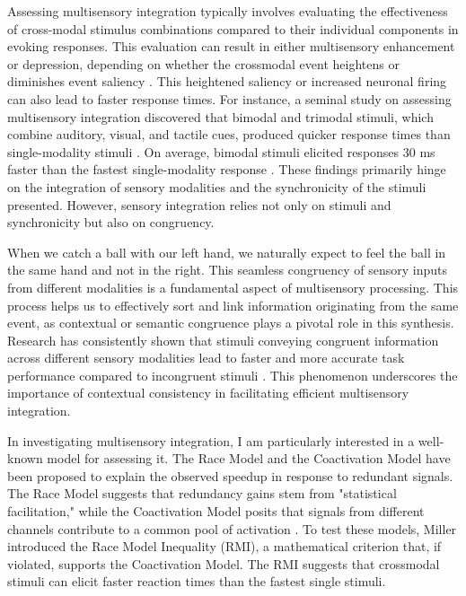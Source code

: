 \documentclass[12pt,oneside,openright]{report}
\begin{document}
Assessing multisensory integration typically involves evaluating the effectiveness of cross-modal stimulus combinations compared to their individual components in evoking responses. This evaluation can result in either multisensory enhancement or depression, depending on whether the crossmodal event heightens or diminishes event saliency \parencite{Stein2008MultisensoryIC}. This heightened saliency or increased neuronal firing can also lead to faster response times. For instance, a seminal study on assessing multisensory integration discovered that bimodal and trimodal stimuli, which combine auditory, visual, and tactile cues, produced quicker response times than single-modality stimuli \parencite{Diederich2004BimodalAT}. On average, bimodal stimuli elicited responses 30 ms faster than the fastest single-modality response \parencite{Diederich2004BimodalAT}. These findings primarily hinge on the integration of sensory modalities and the synchronicity of the stimuli presented. However, sensory integration relies not only on stimuli and synchronicity but also on congruency.

When we catch a ball with our left hand, we naturally expect to feel the ball in the same hand and not in the right. This seamless congruency of sensory inputs from different modalities is a fundamental aspect of multisensory processing. This process helps us to effectively sort and link information originating from the same event, as contextual or semantic congruence plays a pivotal role in this synthesis. Research has consistently shown that stimuli conveying congruent information across different sensory modalities lead to faster and more accurate task performance compared to incongruent stimuli \parencite{Laurienti2003CrossmodalSP}. This phenomenon underscores the importance of contextual consistency in facilitating efficient multisensory integration. 

In investigating multisensory integration, I am particularly interested in a well-known model for assessing it. The Race Model and the Coactivation Model have been proposed to explain the observed speedup in response to redundant signals. The Race Model suggests that redundancy gains stem from "statistical facilitation," while the Coactivation Model posits that signals from different channels contribute to a common pool of activation \parencite{MILLER1982247}. To test these models, Miller introduced the Race Model Inequality (RMI), a mathematical criterion that, if violated, supports the Coactivation Model. The RMI suggests that crossmodal stimuli can elicit faster reaction times than the fastest single stimuli.
\end{document}
